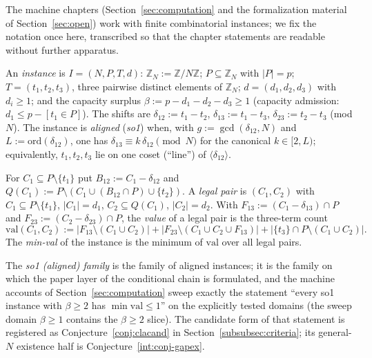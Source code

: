 The machine chapters (Section~\ref{sec:computation} and the formalization material of
Section~\ref{sec:open}) work with finite
combinatorial instances; we fix the notation once here, transcribed so that the chapter
statements are readable without further apparatus.

\begin{definition}[instances]\label{int:def-instance}
An \emph{instance} is $I=(N,P,T,d)$: $\mathbb{Z}_N:=\mathbb{Z}/N\mathbb{Z}$;
$P\subseteq\mathbb{Z}_N$ with $|P|=p$; $T=(t_1,t_2,t_3)$, three pairwise distinct elements
of $\mathbb{Z}_N$; $d=(d_1,d_2,d_3)$ with $d_i\ge1$; and the capacity surplus
$\beta:=p-d_1-d_2-d_3\ge1$ (capacity admission: $d_1\le p-[t_1\in P]$). The shifts are
$\delta_{12}:=t_1-t_2$, $\delta_{13}:=t_1-t_3$, $\delta_{23}:=t_2-t_3$ (mod $N$). The
instance is \emph{aligned} (\emph{so1}) when, with $g:=\gcd(\delta_{12},N)$ and
$L:=\mathrm{ord}(\delta_{12})$, one has $\delta_{13}\equiv k\,\delta_{12}\pmod N$ for the
canonical $k\in[2,L)$; equivalently, $t_1,t_2,t_3$ lie on one coset (``line'') of
$\langle\delta_{12}\rangle$.
\end{definition}

\begin{definition}\label{int:def-legalval}
For $C_1\subseteq P\setminus\{t_1\}$ put $B_{12}:=C_1-\delta_{12}$ and
$Q(C_1):=P\setminus(C_1\cup(B_{12}\cap P)\cup\{t_2\})$. A \emph{legal pair} is
$(C_1,C_2)$ with $C_1\subseteq P\setminus\{t_1\}$, $|C_1|=d_1$, $C_2\subseteq Q(C_1)$,
$|C_2|=d_2$. With $F_{13}:=(C_1-\delta_{13})\cap P$ and $F_{23}:=(C_2-\delta_{23})\cap P$,
the \emph{value} of a legal pair is the three-term count
\[
\mathrm{val}(C_1,C_2)
 :=\bigl|F_{13}\setminus(C_1\cup C_2)\bigr|
  +\bigl|F_{23}\setminus(C_1\cup C_2\cup F_{13})\bigr|
  +\bigl|\{t_3\}\cap P\setminus(C_1\cup C_2)\bigr| .
\]
The \emph{min-val} of the instance is the minimum of $\mathrm{val}$ over all legal pairs.
\end{definition}

The \emph{so1 (aligned) family} is the family of aligned instances; it is the family on
which the paper layer of the conditional chain is formulated, and the machine accounts of
Section~\ref{sec:computation} sweep exactly the statement ``every so1 instance with $\beta\ge2$
has $\min\mathrm{val}\le1$'' on the explicitly tested domains (the sweep domain $\beta\ge1$
contains the $\beta\ge2$ slice). The candidate form of that statement is registered as
Conjecture~\ref{conj:clacand} in Section~\ref{subsubsec:criteria}; its general-$N$ existence
half is Conjecture~\ref{int:conj-gapex}.

